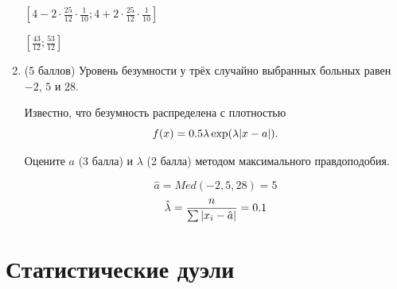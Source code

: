 \documentclass[12pt]{article}
\newenvironment{solution}{}{}
\begin{document}
\begin{enumerate}
\begin{solution}
    $[4 - 2 \cdot \frac{25}{12} \cdot \frac{1}{10}; 4 + 2 \cdot \frac{25}{12} \cdot \frac{1}{10}]$
    
    $[\frac{43}{12}; \frac{53}{12}]$
\end{solution}
    
    
    
    \item (5 баллов) Уровень безумности у трёх случайно выбранных больных равен $-2$, $5$ и $28$.
    
    Известно, что безумность распределена с плотностью 
    \[
    f(x) = 0.5 \lambda \exp(\lambda \abs{x-a}).
    \]
    
    Оцените $a$ (3 балла) и $\lambda$ (2 балла) методом максимального правдоподобия.


\begin{solution}
    \[
    \hat a = Med(-2, 5, 28) = 5
    \]
    \[
    \hat\lambda = \frac{n}{\sum \abs{x_i - \hat a}} = 0.1
    \]
\end{solution}

\end{enumerate}


\newpage

\section*{Статистические дуэли}
\end{document}
